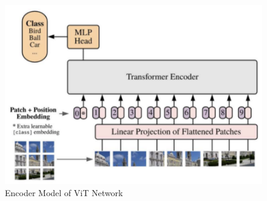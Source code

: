\begin{itemize}
        \begin{figure}
            \centering
            \includegraphics[scale=.7]{figures/vit.png}
            \caption{Encoder Model of ViT Network \cite{peng2022cnn}}
            \label{fig:vit}
        \end{figure}
        

\end{itemize}
